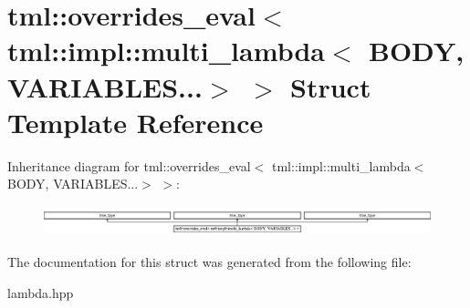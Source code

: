 \hypertarget{structtml_1_1overrides__eval_3_01tml_1_1impl_1_1multi__lambda_3_01BODY_00_01VARIABLES_8_8_8_4_01_4}{\section{tml\+:\+:overrides\+\_\+eval$<$ tml\+:\+:impl\+:\+:multi\+\_\+lambda$<$ B\+O\+D\+Y, V\+A\+R\+I\+A\+B\+L\+E\+S...$>$ $>$ Struct Template Reference}
\label{structtml_1_1overrides__eval_3_01tml_1_1impl_1_1multi__lambda_3_01BODY_00_01VARIABLES_8_8_8_4_01_4}
}
Inheritance diagram for tml\+:\+:overrides\+\_\+eval$<$ tml\+:\+:impl\+:\+:multi\+\_\+lambda$<$ B\+O\+D\+Y, V\+A\+R\+I\+A\+B\+L\+E\+S...$>$ $>$\+:\begin{figure}[H]
\begin{center}
\leavevmode
\includegraphics[height=0.897436cm]{structtml_1_1overrides__eval_3_01tml_1_1impl_1_1multi__lambda_3_01BODY_00_01VARIABLES_8_8_8_4_01_4}
\end{center}
\end{figure}


The documentation for this struct was generated from the following file\+:\begin{DoxyCompactItemize}
\item 
lambda.\+hpp\end{DoxyCompactItemize}
